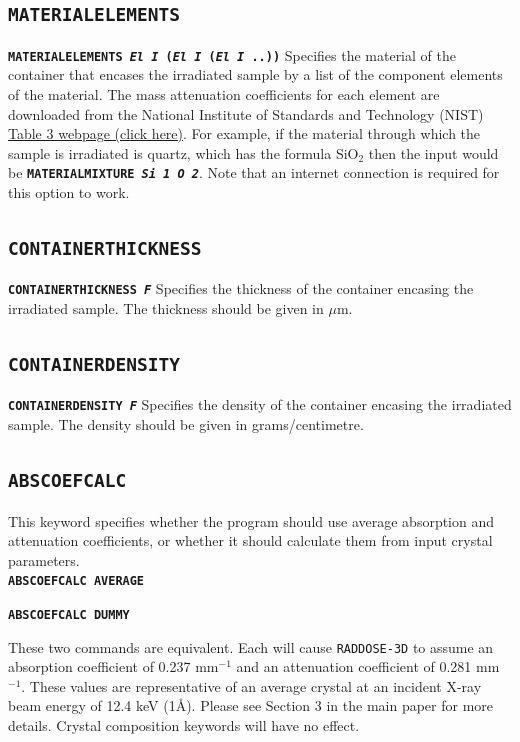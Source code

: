 \documentclass[a4paper]{article}
\newcommand{\RD}{\texttt{RADDOSE-3D}\xspace}
\newcommand{\Keyword}[1]{\texttt{\textbf{#1}}\xspace}
\newcommand{\SB}{\\[0.2em]}
\begin{document}
\subsection{\Keyword{MATERIALELEMENTS}}
\label{materialelements}
\noindent \Keyword{MATERIALELEMENTS \textit{El I} (\textit{El I} (\textit{El I} ..))}
Specifies the material of the container that encases the irradiated sample by a list of the component elements of the material. The mass attenuation coefficients for each element are downloaded from the National Institute of Standards and Technology (NIST) \href{http://physics.nist.gov/PhysRefData/XrayMassCoef/tab3.html}{Table 3 webpage (click here)}. For example, if the material through which the sample is irradiated is quartz, which has the formula SiO$_2$ then the input would be \Keyword{MATERIALMIXTURE \textit{Si 1 O 2}}. Note that an internet connection is required for this option to work.

\subsection{\Keyword{CONTAINERTHICKNESS}}

\noindent \Keyword{CONTAINERTHICKNESS \textit{F}}
Specifies the thickness of the container encasing the irradiated sample. The thickness should be given in $\mu$m.

\subsection{\Keyword{CONTAINERDENSITY}}

\noindent \Keyword{CONTAINERDENSITY \textit{F}}
Specifies the density of the container encasing the irradiated sample. The density should be given in grams/centimetre.


\newpage
\subsection{\Keyword{ABSCOEFCALC}}
\label{abscoefcalc}
This keyword specifies whether the program should use average absorption and attenuation coefficients, or whether it should calculate them from input crystal parameters.\SB

\noindent \Keyword{ABSCOEFCALC AVERAGE}

\noindent \Keyword{ABSCOEFCALC DUMMY}

These two commands are equivalent. Each will cause \RD to assume an absorption coefficient of 0.237 mm$^{-1}$ and an attenuation coefficient of 0.281 mm$^{-1}$. These values are representative of an average crystal at an incident X-ray beam energy of 12.4 keV (1\AA). Please see Section 3 in the main paper for more details. Crystal composition keywords will have no effect.\SB
\end{document}
